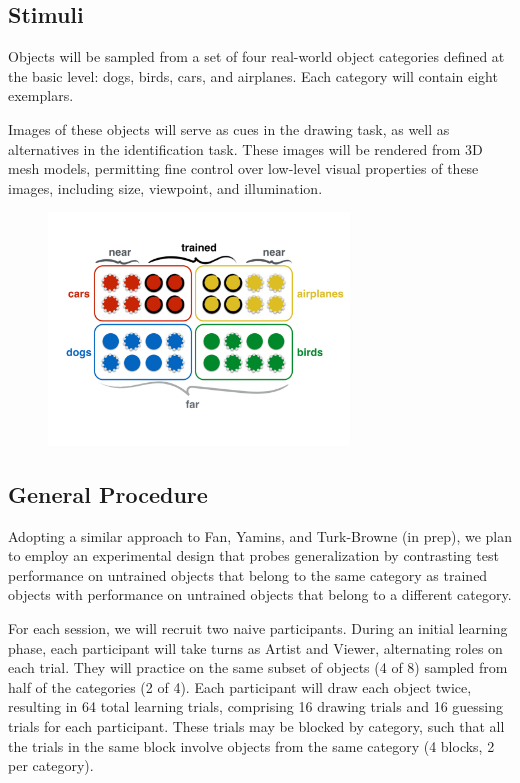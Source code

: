 \documentclass[12pt]{article}
\begin{document}

\subsection{Stimuli}

Objects will be sampled from a set of four real-world object categories defined at the basic level: dogs, birds, cars, and airplanes. Each category will contain eight exemplars. 

Images of these objects will serve as cues in the drawing task, as well as alternatives in the identification task. These images will be rendered from 3D mesh models, permitting fine control over low-level visual properties of these images, including size, viewpoint, and illumination. 

\begin{figure}[hbtp]
\begin{center}
\includegraphics[width=80mm]{figures/design.pdf}
\end{center}
\end{figure}
\vspace{-10mm}

\subsection{General Procedure}

Adopting a similar approach to Fan, Yamins, and Turk-Browne (in prep), we plan to employ an experimental design that probes generalization by contrasting test performance on untrained objects that belong to the same category as trained objects with performance on untrained objects that belong to a different category. 

For each session, we will recruit two naive participants. During an initial learning phase, each participant will take turns as Artist and Viewer, alternating roles on each trial. They will practice on the same subset of objects (4 of 8) sampled from half of the categories (2 of 4). Each participant will draw each object twice, resulting in 64 total learning trials, comprising 16 drawing trials and 16 guessing trials for each participant. These trials may be blocked by category, such that all the trials in the same block involve objects from the same category (4 blocks, 2 per category). 
\end{document}
